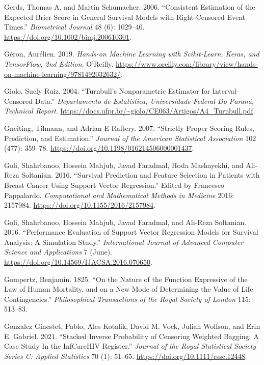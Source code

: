 \documentclass[
  letterpaper,
  krantz2]{style/krantz}
\newlength{\cslhangindent}
\newenvironment{CSLReferences}[2] %
 {\begin{list}{}{%
  \setlength{\itemindent}{0pt}
  \setlength{\leftmargin}{0pt}
  \setlength{\parsep}{0pt}
  \ifodd #1
   \setlength{\leftmargin}{\cslhangindent}
   \setlength{\itemindent}{-1\cslhangindent}
  \fi
  \setlength{\itemsep}{#2\baselineskip}}}
 {\end{list}}
\begin{document}
\begin{CSLReferences}{1}{0}
Gerds, Thomas A, and Martin Schumacher. 2006. {``{Consistent Estimation
of the Expected Brier Score in General Survival Models with
Right-Censored Event Times}.''} \emph{Biometrical Journal} 48 (6):
1029--40. \url{https://doi.org/10.1002/bimj.200610301}.

Géron, Aurélien. 2019. \emph{Hands-on Machine Learning with
Scikit-Learn, Keras, and TensorFlow, 2nd Edition}. O'Reilly.
\url{https://www.oreilly.com/library/view/hands-on-machine-learning/9781492032632/}.

Giolo, Suely Ruiz. 2004. {``Turnbull's Nonparametric Estimator for
Interval-Censored Data.''} \emph{Departamento de Estatística,
Universidade Federal Do Paraná, Technical Report}.
\url{https://docs.ufpr.br/~giolo/CE063/Artigos/A4_Turnbull.pdf}.

Gneiting, Tilmann, and Adrian E Raftery. 2007. {``{Strictly Proper
Scoring Rules, Prediction, and Estimation}.''} \emph{Journal of the
American Statistical Association} 102 (477): 359--78.
\url{https://doi.org/10.1198/016214506000001437}.

Goli, Shahrbanoo, Hossein Mahjub, Javad Faradmal, Hoda Mashayekhi, and
Ali-Reza Soltanian. 2016. {``{Survival Prediction and Feature Selection
in Patients with Breast Cancer Using Support Vector Regression}.''}
Edited by Francesco Pappalardo. \emph{Computational and Mathematical
Methods in Medicine} 2016: 2157984.
\url{https://doi.org/10.1155/2016/2157984}.

Goli, Shahrbanoo, Hossein Mahjub, Javad Faradmal, and Ali-Reza
Soltanian. 2016. {``{Performance Evaluation of Support Vector Regression
Models for Survival Analysis: A Simulation Study}.''}
\emph{International Journal of Advanced Computer Science and
Applications} 7 (June).
\url{https://doi.org/10.14569/IJACSA.2016.070650}.

Gompertz, Benjamin. 1825. {``{On the Nature of the Function Expressive
of the Law of Human Mortality, and on a New Mode of Determining the
Value of Life Contingencies}.''} \emph{Philosophical Transactions of the
Royal Society of London} 115: 513--83.

Gonzalez Ginestet, Pablo, Ales Kotalik, David M. Vock, Julian Wolfson,
and Erin E. Gabriel. 2021. {``Stacked {Inverse Probability} of
{Censoring Weighted Bagging}: {A Case Study In} the {InfCareHIV
Register}.''} \emph{Journal of the Royal Statistical Society Series C:
Applied Statistics} 70 (1): 51--65.
\url{https://doi.org/10.1111/rssc.12448}.


\end{CSLReferences}
\end{document}
